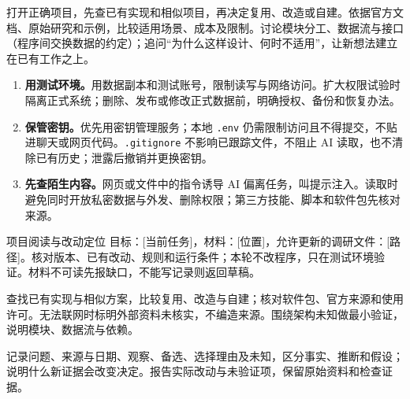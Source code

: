 打开正确项目，先查已有实现和相似项目，再决定复用、改造或自建。依据官方文档、原始研究和示例，比较适用场景、成本及限制。讨论模块分工、数据流与接口（程序间交换数据的约定）；追问“为什么这样设计、何时不适用”，让新想法建立在已有工作之上。
\begin{enumerate}
\item \textbf{用测试环境。}用数据副本和测试账号，限制读写与网络访问。扩大权限试验时隔离正式系统；删除、发布或修改正式数据前，明确授权、备份和恢复办法。
\item \textbf{保管密钥。}优先用密钥管理服务；本地 \texttt{.env} 仍需限制访问且不得提交，不贴进聊天或网页代码。\texttt{.gitignore} 不影响已跟踪文件，不阻止 AI 读取，也不清除已有历史；泄露后撤销并更换密钥。
\item \textbf{先查陌生内容。}网页或文件中的指令诱导 AI 偏离任务，叫提示注入。读取时避免同时开放私密数据与外发、删除权限；第三方技能、脚本和软件包先核对来源。
\end{enumerate}
\begin{prompt}{项目阅读与改动定位}
目标：[当前任务]，材料：[位置]，允许更新的调研文件：[路径]。核对版本、已有改动、规则和运行条件；本轮不改程序，只在测试环境验证。材料不可读先报缺口，不能写记录则返回草稿。\par
查找已有实现与相似方案，比较复用、改造与自建；核对软件包、官方来源和使用许可。无法联网时标明外部资料未核实，不编造来源。围绕架构未知做最小验证，说明模块、数据流与依赖。\par
记录问题、来源与日期、观察、备选、选择理由及未知，区分事实、推断和假设；说明什么新证据会改变决定。报告实际改动与未验证项，保留原始资料和检查证据。
\end{prompt}
